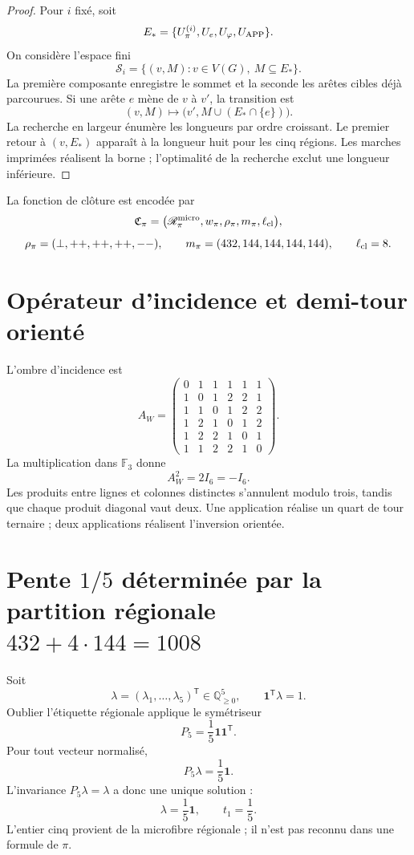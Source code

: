 \begin{proof}
Pour \(i\) fixé, soit
\[
 E_*=\{U_\pi^{(i)},U_e,U_\varphi,U_{\rm APP}\}.
\]
On considère l’espace fini
\[
 \mathscr S_i=\{(v,M):v\in V(G),\ M\subseteq E_*\}.
\]
La première composante enregistre le sommet et la seconde les arêtes cibles
déjà parcourues. Si une arête \(e\) mène de \(v\) à \(v'\), la transition est
\[
 (v,M)\longmapsto
 \bigl(v',M\cup(E_*\cap\{e\})\bigr).
\]
La recherche en largeur énumère les longueurs par ordre croissant. Le premier
retour à \((v,E_*)\) apparaît à la longueur huit pour les cinq régions.
Les marches imprimées réalisent la borne ; l’optimalité de la recherche exclut
une longueur inférieure.
\end{proof}

La fonction de clôture est encodée par
\[
 \mathfrak C_\pi=
 \bigl(\mathscr R_\pi^{\rm micro},
 w_\pi,\rho_\pi,m_\pi,\ell_{\rm cl}\bigr),
\]
\[
 \rho_\pi=(\perp,++ ,++ ,++ ,--),
 \qquad
 m_\pi=(432,144,144,144,144),
 \qquad
 \ell_{\rm cl}=8.
\]

\section{Opérateur d’incidence et demi-tour orienté}

L’ombre d’incidence est
\[
 A_W=
 \begin{pmatrix}
 0&1&1&1&1&1\\
 1&0&1&2&2&1\\
 1&1&0&1&2&2\\
 1&2&1&0&1&2\\
 1&2&2&1&0&1\\
 1&1&2&2&1&0
 \end{pmatrix}.
\]
La multiplication dans \(\mathbb F_3\) donne
\begin{equation}
 \boxed{A_W^2=2I_6=-I_6.}
 \label{gfp:b:eq:aw-cuadrado-menos-identidad-pi}
\end{equation}
Les produits entre lignes et colonnes distinctes s’annulent modulo trois,
tandis que chaque produit diagonal vaut deux. Une application réalise un quart
de tour ternaire ; deux applications réalisent l’inversion orientée.

\section{Pente \texorpdfstring{\(1/5\)}{1/5} déterminée par la partition régionale \(432+4\cdot144=1008\)}

Soit
\[
 \lambda=(\lambda_1,\ldots,\lambda_5)^{\mathsf T}
 \in\mathbb Q_{\geq0}^5,
 \qquad
 \mathbf1^{\mathsf T}\lambda=1.
\]
Oublier l’étiquette régionale applique le symétriseur
\[
 P_5=\frac15\mathbf1\mathbf1^{\mathsf T}.
\]
Pour tout vecteur normalisé,
\[
 P_5\lambda=\frac15\mathbf1.
\]
L’invariance \(P_5\lambda=\lambda\) a donc une unique solution :
\begin{equation}
 \boxed{\lambda=\frac15\mathbf1,\qquad t_1=\frac15.}
 \label{gfp:b:eq:pendiente-primitiva-pi}
\end{equation}
L’entier cinq provient de la microfibre régionale ; il n’est pas reconnu dans une
formule de \(\pi\).

